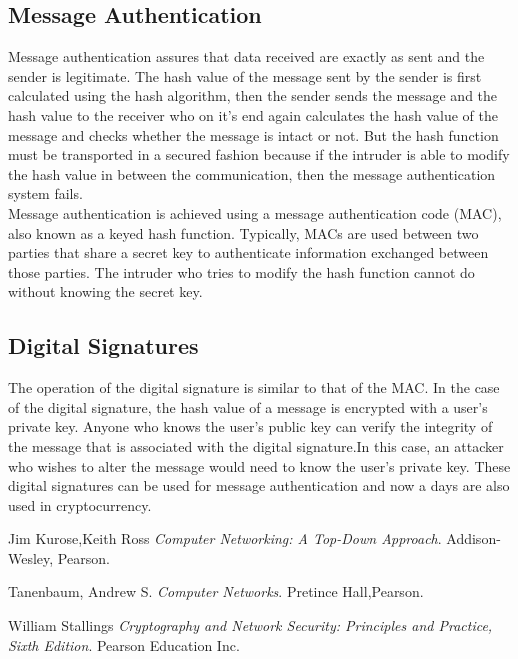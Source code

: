 \documentclass{article}
\begin{document}
\subsection{Message Authentication}
Message authentication assures that data received are exactly as sent and the sender is legitimate. The hash value of the message sent by the sender is first calculated using the hash algorithm, then the sender sends the message and the hash value to the receiver who on it's end again calculates the hash value of the message and checks whether the message is intact or not. But the hash function must be transported in a secured fashion because if the intruder is able to modify the hash value in between the communication, then the message authentication system fails.\\
Message authentication is achieved using a message authentication code (MAC), also known as a keyed hash function. Typically, MACs are used between two parties that share a secret key to authenticate information exchanged between those parties. The intruder who tries to modify the hash function cannot do without knowing the secret key.\\
\subsection{Digital Signatures}
The operation of the digital signature is similar to that of the MAC. In the case of the digital signature, the hash value of a message is encrypted with a user’s private key. Anyone who knows the user’s public key can verify the integrity of the message that is associated with the digital signature.In this case, an attacker who wishes to alter the message would need to know the user’s private key. These digital signatures can be used for message authentication and now a days are also used in cryptocurrency.\\

\begin{thebibliography}{9}
Jim Kurose,Keith Ross 
\textit{Computer Networking: A Top-Down Approach}.
Addison-Wesley, Pearson.

Tanenbaum, Andrew S. 
\textit{Computer Networks}.
Pretince Hall,Pearson.

William Stallings
\textit{Cryptography and Network Security: Principles and Practice, Sixth Edition}.
Pearson Education Inc.
\end{thebibliography}
\end{document}
